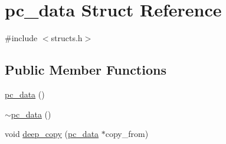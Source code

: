 \hypertarget{structpc__data}{\section{pc\-\_\-data Struct Reference}
\label{structpc__data}
}


{\ttfamily \#include $<$structs.\-h$>$}

\subsection*{Public Member Functions}
\begin{DoxyCompactItemize}
\item 
\hyperlink{structpc__data_a683009cecb49ac143117e4873e104ccc}{pc\-\_\-data} ()
\item 
\hyperlink{structpc__data_a7c1b5bd2b1d45faefef09cb7a353443d}{$\sim$pc\-\_\-data} ()
\item 
void \hyperlink{structpc__data_a4ac95ef485c0f399dc8cea0182f297f0}{deep\-\_\-copy} (\hyperlink{structpc__data}{pc\-\_\-data} $\ast$copy\-\_\-from)
\end{DoxyCompactItemize}
